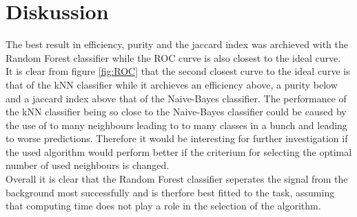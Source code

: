 \section{Diskussion}\label{sec:Durchführung}

The best result in efficiency, purity and the jaccard index was archieved with the Random Forest classifier while the ROC curve 
is also closest to the ideal curve. \\
It is clear from figure \ref{fig:ROC} that the second closest curve to the ideal curve is that of the kNN classifier while 
it archieves an efficiency above, a purity below and a jaccard index above that of the Naive-Bayes classifier. 
The performance of the kNN classifier being so close to the Naive-Bayes classifier could be caused by the use of 
to many neighbours leading to to many classes in a bunch and leading to worse predictions. 
Therefore it would be interesting for further investigation if the used algorithm would perform better 
if the criterium for selecting the optimal number of used neighbours is changed. \\
Overall it is clear that the Random Forest classifier seperates the signal from the background most successfully 
and is therfore best fitted to the task, assuming that computing time does not play a role in the selection of the algorithm.